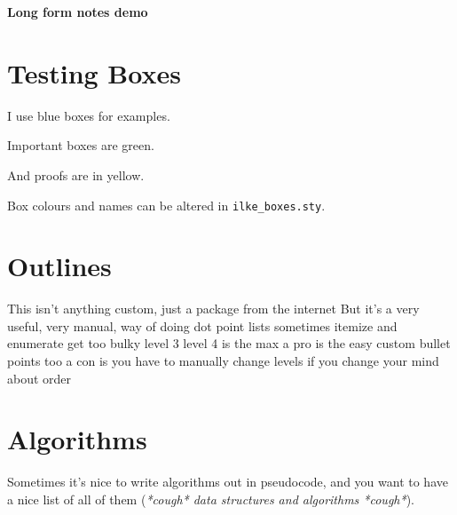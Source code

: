 \documentclass[11pt]{article}
\title{}
\author{Ilke Dincer}
\date{}
\begin{document}
\begin{center}
    \LARGE
    \textbf{Long form notes demo}
\end{center}

\tableofcontents \label{toc}


\pagebreak
{}
\section{Testing Boxes}

\begin{example-box}
  I use blue boxes for examples. 
\end{example-box}


\begin{important-box}
Important boxes are green. 
\end{important-box}

\begin{proof-box}
  And proofs are in yellow. 
\end{proof-box}

Box colours and names can be altered in \texttt{ilke\_boxes.sty}. 


\section{Outlines}

\begin{outline}
\0 This isn't anything custom, just a package from the internet
  \1 But it's a very useful, very manual, way of doing dot point lists
    \2 sometimes itemize and enumerate get too bulky
      \3 level 3
        \4 level 4 is the max
  \1[+] a pro is the easy custom bullet points too
  \1[-] a con is you have to manually change levels if you change your mind about order
\end{outline}


\section{Algorithms}
Sometimes it's nice to write algorithms out in pseudocode, and you want to have a nice list of all of them (\textit{*cough* data structures and algorithms *cough*}). 
\end{document}

